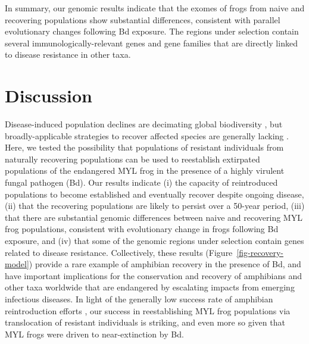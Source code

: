 \documentclass[9pt,twocolumn,twoside,lineno]{pnas-new}
\begin{document}
In summary, our genomic results indicate that the exomes of frogs from
naive and recovering populations show substantial differences,
consistent with parallel evolutionary changes following Bd exposure. The
regions under selection contain several immunologically-relevant genes
and gene families that are directly linked to disease resistance in
other taxa.

\section*{Discussion}

Disease-induced population declines are decimating global biodiversity
\citep{daszak2000}, but broadly-applicable strategies to recover
affected species are generally lacking \citep[e.g.,][]{garner2016}.
Here, we tested the possibility that populations of resistant
individuals from naturally recovering populations can be used to
reestablish extirpated populations of the endangered MYL frog in the
presence of a highly virulent fungal pathogen (Bd). Our results indicate
(i) the capacity of reintroduced populations to become established and
eventually recover despite ongoing disease, (ii) that the recovering
populations are likely to persist over a 50-year period, (iii) that
there are substantial genomic differences between naive and recovering
MYL frog populations, consistent with evolutionary change in frogs
following Bd exposure, and (iv) that some of the genomic regions under
selection contain genes related to disease resistance. Collectively,
these results (Figure~\ref{fig-recovery-model}) provide a rare example
of amphibian recovery in the presence of Bd, and have important
implications for the conservation and recovery of amphibians and other
taxa worldwide that are endangered by escalating impacts from emerging
infectious diseases. In light of the generally low success rate of
amphibian reintroduction efforts \citep{dodd2005}, our success in
reestablishing MYL frog populations via translocation of resistant
individuals is striking, and even more so given that MYL frogs were
driven to near-extinction by Bd.
\end{document}
